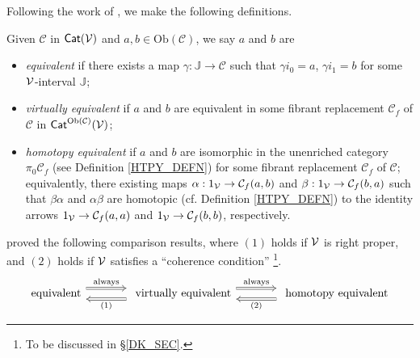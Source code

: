 \documentclass[a4paper,10pt
,draft
]{article}%
\newcommand{\J}{\mathbb J}
\renewcommand{\1}{\eta}%
\begin{document}
Following the work of \cite{Cav, BM13}, we make the following definitions.

\begin{definition}
      \label{EQUIV_DEF}
      Given $\mathcal{C}$ in  $\mathsf{Cat}(\mathcal V)$ and $a,b\in\mathrm{Ob}(\mathcal C)$, we say $a$ and $b$ are
      \begin{itemize}
      \item {\em equivalent} if there exists a map $\gamma: \J \to \mathcal C$ such that
            $\gamma i_0 = a$, $\gamma i_1 = b$
            for some $\mathcal V$-interval $\J$;
      \item {\em virtually equivalent} if $a$ and $b$ are equivalent in some fibrant replacement
            $\mathcal C_f$ of $\mathcal C$ in $\mathsf{Cat}^{\mathrm{Ob}(\mathcal C)}(\mathcal V)$;
      \item {\em homotopy equivalent} if $a$ and $b$ are isomorphic in the unenriched category $\pi_0 \mathcal C_f$ (see Definition \ref{HTPY_DEFN})
            for some fibrant replacement $\mathcal C_f$ of $\mathcal C$;
            equivalently,
            there existing maps
            $\alpha: 1_{\mathcal V} \to \mathcal C_f(a,b)$ and $\beta: 1_{\mathcal V}\to \mathcal C_f(b,a)$ such that
            $\beta\alpha$ and $\alpha\beta$ are homotopic (cf. Definition \ref{HTPY_DEFN})
            to the identity arrows
            $1_{\mathcal V} \to \mathcal C_f(a,a)$ and $1_{\mathcal V} \to \mathcal C_f(b,b)$, respectively.
      \end{itemize}
\end{definition}

\cite{Cav, BM13} proved the following comparison results,
where $(1)$ holds if $\mathcal V$ is right proper, and $(2)$ holds if $\mathcal V$ satisfies a ``coherence condition'' \footnote{To be discussed in \S \ref{DK_SEC}.}.
\[
      \begin{tikzcd}[column sep = large]
            \mbox{equivalent}
            \arrow[r, Rightarrow, shift left=2, "\mathrm{always}"]
            &
            \mbox{ virtually equivalent}
            \arrow[r, Rightarrow, shift left=2, "\mathrm{always}"]
            \arrow[l, Rightarrow, shift left = 2, "{(1)}"]
            &
            \mbox{ homotopy equivalent}
            \arrow[l, Rightarrow, shift left = 2, "{(2)}"]
      \end{tikzcd}
\]
\end{document}
